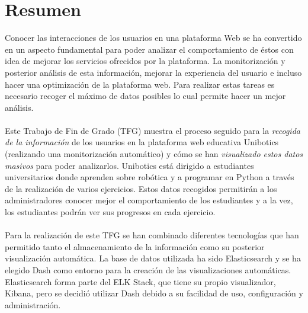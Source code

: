 \newpage
\thispagestyle{plain}			%
\setlength{\parskip}{0pt plus 1.0pt}
\section*{Resumen}
Conocer las interacciones de los usuarios en una plataforma Web se ha convertido en un aspecto fundamental para poder analizar el comportamiento de éstos con idea de mejorar los servicios ofrecidos por la plataforma. La monitorización y posterior análisis de esta información, mejorar la experiencia del usuario e incluso hacer una optimización de la plataforma web. Para realizar estas tareas es necesario recoger el máximo de datos posibles lo cual permite hacer un mejor análisis.
\\
 \\
Este Trabajo de Fin de Grado (TFG) muestra el proceso seguido para la \textit{recogida de la información} de los usuarios en la plataforma web educativa Unibotics (realizando una monitorización automático) y cómo se han \textit{visualizado estos datos masivos} para poder analizarlos. Unibotics está dirigido a estudiantes universitarios donde aprenden sobre robótica y a programar en Python a través de la realización de varios ejercicios. Estos datos recogidos permitirán a los administradores conocer mejor el comportamiento de los estudiantes y a la vez, los estudiantes podrán ver sus progresos en cada ejercicio.
\\
\\
Para la realización de este TFG se han combinado diferentes tecnologías que han permitido tanto el almacenamiento de la información como su posterior visualización automática. La base de datos utilizada ha sido Elasticsearch y se ha elegido Dash como entorno para la creación de las visualizaciones automáticas. Elasticsearch forma parte del ELK Stack, que tiene su propio visualizador, Kibana, pero se decidió utilizar Dash debido a su facilidad de uso, configuración y administración.

